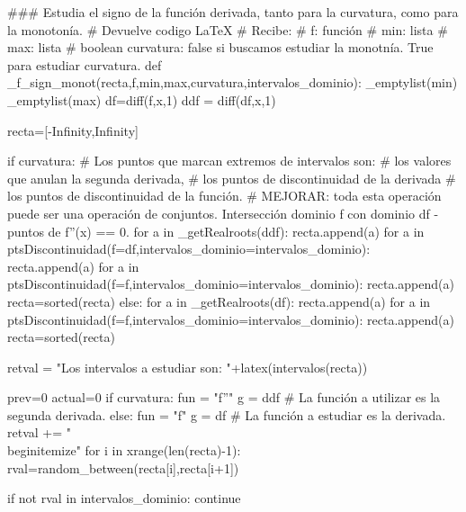 \begin{sagesilent}
### Estudia el signo de la función derivada, tanto para la curvatura, como para la monotonía.
# Devuelve codigo LaTeX
# Recibe:
# f: función
# min: lista
# max: lista
# boolean curvatura: false si buscamos estudiar la monotnía. True para estudiar curvatura.
def _f_sign_monot(recta,f,min,max,curvatura,intervalos_dominio):
 _emptylist(min)
 _emptylist(max)
 df=diff(f,x,1)
 ddf = diff(df,x,1)

 recta=[-Infinity,Infinity]
 

 if curvatura:
    # Los puntos que marcan extremos de intervalos son:
    #       los valores que anulan la segunda derivada, 
    #       los puntos de discontinuidad de la derivada 
    #       los puntos de discontinuidad de la función.
    # MEJORAR: toda esta operación puede ser una operación de conjuntos. Intersección dominio f con dominio df - puntos de f''(x) == 0.
    for a in _getRealroots(ddf):
        recta.append(a)
    for a in ptsDiscontinuidad(f=df,intervalos_dominio=intervalos_dominio):
        recta.append(a)
    for a in ptsDiscontinuidad(f=f,intervalos_dominio=intervalos_dominio):
        recta.append(a)
    recta=sorted(recta) 
 else:
    for a in _getRealroots(df):
        recta.append(a)
    for a in ptsDiscontinuidad(f=f,intervalos_dominio=intervalos_dominio):
        recta.append(a)
    recta=sorted(recta) 
 
 retval = "Los intervalos a estudiar son: "+latex(intervalos(recta))
 
 prev=0
 actual=0
 if curvatura:
    fun = "f''"
    g = ddf # La función a utilizar es la segunda derivada.
 else:
    fun = "f"
    g = df # La función a estudiar es la derivada.
 retval += "\\begin{itemize}"
 for i in xrange(len(recta)-1):
  rval=random_between(recta[i],recta[i+1])

  if not rval in intervalos_dominio:
    continue
  

\end{sagesilent}
